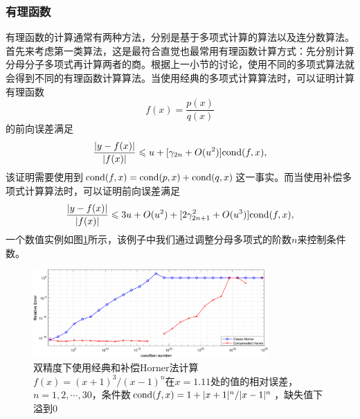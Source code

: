 \documentclass[a4paper,10pt]{ctexart}
\begin{document}
\subsubsection{有理函数}
有理函数的计算通常有两种方法，分别是基于多项式计算的算法以及连分数算法。首先来考虑第一类算法，这是最符合直觉也最常用有理函数计算方式：先分别计算分母分子多项式再计算两者的商。根据上一小节的讨论，使用不同的多项式算法就会得到不同的有理函数计算算法。当使用经典的多项式计算算法时，可以证明计算有理函数
\[
    f(x) = \frac{p(x)}{q(x)}
\]
的前向误差满足
\begin{equation}
    \frac{|y - f(x)|}{|f(x)|} \leqslant u + [\gamma_{2n} + O(u^2)] {\rm cond}(f,x),
\end{equation}
该证明需要使用到$ {\rm cond}(f,x) = {\rm cond}(p,x) + {\rm cond}(q,x) $这一事实。而当使用补偿多项式计算算法时，可以证明前向误差满足
\begin{equation}
    \frac{|y - f(x)|}{|f(x)|} \leqslant 3u + O(u^2) + [2\gamma_{2n+1}^2 + O(u^3)] {\rm cond}(f,x),
\end{equation}
一个数值实例如图\ref{fig:RationalHorner}所示，该例子中我们通过调整分母多项式的阶数$ n $来控制条件数。
\begin{figure}[htpb]
    \centering
    \includegraphics[width=0.8\textwidth]{RationalHorner.png}
    \caption{双精度下使用经典和补偿Horner法计算$ f(x) = (x+1)^3/(x-1)^n $在$ x=1.11 $处的值的相对误差，$ n=1,2,\cdots ,30 $，条件数$ {\rm cond}(f,x) = 1 + |x+1|^n / |x-1|^n $，缺失值下溢到0}
    \label{fig:RationalHorner}
\end{figure}
\end{document}
